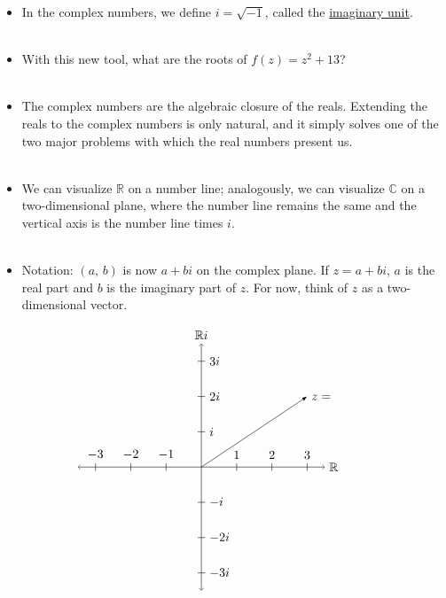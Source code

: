 \documentclass{beamer}
\newcommand{\R}{\mathbb{R}}
\newcommand{\C}{\mathbb{C}}
\begin{document}
\frame
{
\begin{itemize}
\item<1-> In the complex numbers, we define $i = \sqrt{-1}$, called the \underline{imaginary unit}. \\\text{}\\ %

\item<2-> With this new tool, what are the roots of $f(z) = z^2 +13$? \\\text{}\\

\item<3-> The complex numbers are the algebraic closure of the reals. Extending the reals to the complex numbers is only natural, and it simply solves one of the two major problems with which the real numbers present us. \\\text{}\\ %

\item<4-> We can visualize $\R$ on a number line; analogously, we can visualize $\C$ on a two-dimensional plane, where the number line remains the same and the vertical axis is the number line times $i$.\\\text{}\\ 

\item<5-> Notation: $(a,\, b)$ is now $a +bi$ on the complex plane. If $z = a + bi$,  $a$ is the real part and $b$ is the imaginary part of $z$. For now, think of $z$ as a two-dimensional vector.
\end{itemize}
}

\frame
{

$$
\begin{tikzpicture}
\draw [<->] (-3.5, 0) -- (3.5, 0) node [right] {$\R$};
\draw [<->] (0, -3.5) -- (0, 3.5) node [above] {$\R i$};

\foreach \n in {-3,...,-1,1,2,...,3} {
\draw (\n,-3pt) -- (\n,3pt)   node [above] {$\n$};
}

\foreach \n in {-3,-2,2,3} {  
\draw (-3pt,\n) -- (3pt,\n)   node [right] {$\n i$};
}

\draw (-3pt, -1) -- (3pt, -1)   node [right] {$-i$};
\draw (-3pt, 1) -- (3pt, 1)   node [right] {$i$};

\draw[-latex] (0,0)--(3,2) node[right, black]{$z=\phantom{ 3 + 2i}$};

\end{tikzpicture}
$$

}
\end{document}
